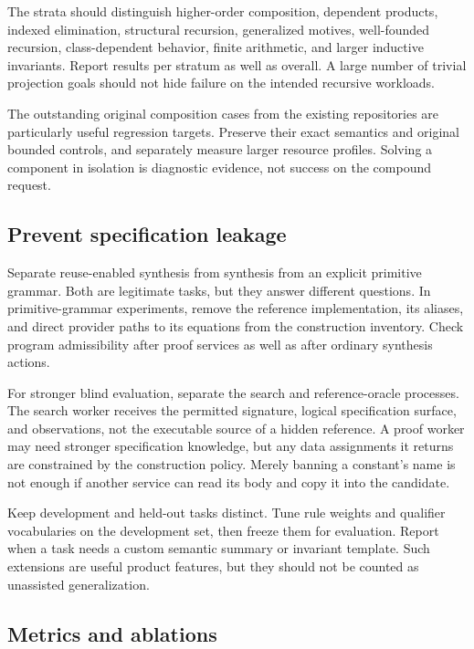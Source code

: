 \documentclass[11pt,letterpaper]{article}
\theoremstyle{definition}
\theoremstyle{remark}
\begin{document}
The strata should distinguish higher-order composition, dependent products, indexed elimination, structural recursion, generalized motives, well-founded recursion, class-dependent behavior, finite arithmetic, and larger inductive invariants. Report results per stratum as well as overall. A large number of trivial projection goals should not hide failure on the intended recursive workloads.

The outstanding original composition cases from the existing repositories are particularly useful regression targets. Preserve their exact semantics and original bounded controls, and separately measure larger resource profiles. Solving a component in isolation is diagnostic evidence, not success on the compound request.

\subsection{Prevent specification leakage}

Separate reuse-enabled synthesis from synthesis from an explicit primitive grammar. Both are legitimate tasks, but they answer different questions. In primitive-grammar experiments, remove the reference implementation, its aliases, and direct provider paths to its equations from the construction inventory. Check program admissibility after proof services as well as after ordinary synthesis actions.

For stronger blind evaluation, separate the search and reference-oracle processes. The search worker receives the permitted signature, logical specification surface, and observations, not the executable source of a hidden reference. A proof worker may need stronger specification knowledge, but any data assignments it returns are constrained by the construction policy. Merely banning a constant's name is not enough if another service can read its body and copy it into the candidate.

Keep development and held-out tasks distinct. Tune rule weights and qualifier vocabularies on the development set, then freeze them for evaluation. Report when a task needs a custom semantic summary or invariant template. Such extensions are useful product features, but they should not be counted as unassisted generalization.

\subsection{Metrics and ablations}
\end{document}
